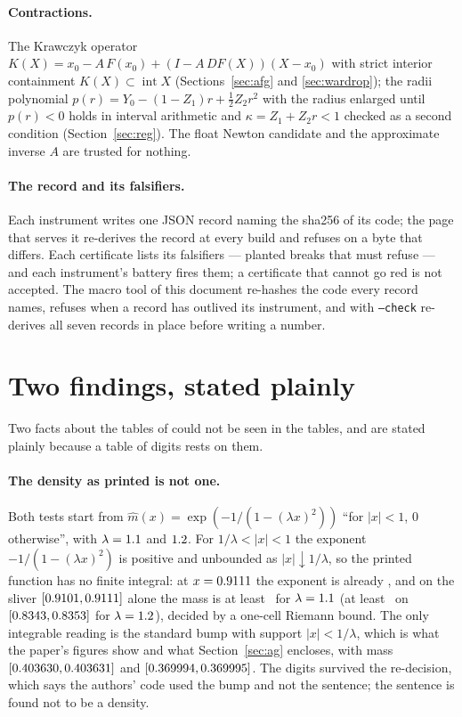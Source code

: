 \documentclass[11pt]{article}
\begin{document}
\paragraph{Contractions.} The Krawczyk operator $K(X) = x_0 - A\,F(x_0) + (I - A\,DF(X))(X - x_0)$ with strict interior containment $K(X) \subset \operatorname{int} X$ (Sections~\ref{sec:afg} and \ref{sec:wardrop}); the radii polynomial $p(r) = Y_0 - (1 - Z_1)r + \tfrac12 Z_2 r^2$ with the radius enlarged until $p(r) < 0$ holds in interval arithmetic and $\kappa = Z_1 + Z_2 r < 1$ checked as a second condition (Section~\ref{sec:reg}). The float Newton candidate and the approximate inverse $A$ are trusted for nothing.

\paragraph{The record and its falsifiers.} Each instrument writes one JSON record naming the sha256 of its code; the page that serves it re-derives the record at every build and refuses on a byte that differs. Each certificate lists its falsifiers --- planted breaks that must refuse --- and each instrument's battery fires them; a certificate that cannot go red is not accepted. The macro tool of this document re-hashes the code every record names, refuses when a record has outlived its instrument, and with \texttt{--check} re-derives all seven records in place before writing a number.

\section{Two findings, stated plainly}\label{sec:findings}

Two facts about the tables of \cite{AG25} could not be seen in the tables, and are stated plainly because a table of digits rests on them.

\paragraph{The density as printed is not one.} Both tests start from $\hat m(x) = \exp(-1/(1 - (\lambda x)^2))$ ``for $|x| < 1$, $0$ otherwise'', with $\lambda = 1.1$ and $1.2$. For $1/\lambda < |x| < 1$ the exponent $-1/(1 - (\lambda x)^2)$ is positive and unbounded as $|x| \downarrow 1/\lambda$, so the printed function has no finite integral: at $x = 0.9111$ the exponent is already \AGExponentAtTo, and on the sliver $[0.9101, 0.9111]$ alone the mass is at least \AGMassOne\ for $\lambda = 1.1$ (at least \AGMassTwo\ on $[0.8343, 0.8353]$ for $\lambda = 1.2$), decided by a one-cell Riemann bound. The only integrable reading is the standard bump with support $|x| < 1/\lambda$, which is what the paper's figures show and what Section~\ref{sec:ag} encloses, with mass $[0.403630, 0.403631]$ and $[0.369994, 0.369995]$. The digits survived the re-decision, which says the authors' code used the bump and not the sentence; the sentence is found not to be a density.
\end{document}
